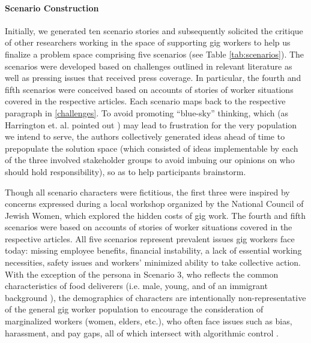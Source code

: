\paragraph{Scenario Construction}
Initially, we generated ten scenario stories and subsequently solicited the critique of other researchers working in the space of supporting gig workers to help us finalize a problem space comprising five scenarios (see Table \ref{tab:scenarios}).
The scenarios were developed based on challenges outlined in relevant literature as well as pressing issues that received press coverage. In particular, the fourth \cite{Al_Jazeera2022-vz} and fifth \cite{noauthor_undated-xr} scenarios were conceived based on accounts of stories of worker situations covered in the respective articles. Each scenario maps back to the respective paragraph in 
\ref{challenges}.
To avoid promoting ``blue-sky'' thinking, which (as Harrington et. al. pointed out \cite{harrington2019deconstructing}) may lead to frustration for the very population we intend to serve, the authors collectively generated ideas ahead of time to prepopulate the solution space (which consisted of ideas implementable by each of the three involved stakeholder groups to avoid imbuing our opinions on who should hold responsibility), so as to help participants brainstorm.

Though all scenario characters were fictitious, the first three were inspired by concerns expressed during a local workshop organized by the National Council of Jewish Women, which explored the hidden costs of gig work. The fourth \cite{Al_Jazeera2022-vz} and fifth \cite{noauthor_undated-xr} scenarios were based on accounts of stories of worker situations covered in the respective articles. All five scenarios represent prevalent issues gig workers face today: missing employee benefits, financial instability, a lack of essential working necessities, safety issues and workers' minimized ability to take collective action. With the exception of the persona in Scenario 3, who reflects the common characteristics of food deliverers (i.e. male, young, and of an immigrant background \cite{ma2022brush}), the demographics of characters are intentionally non-representative of the general gig worker population to encourage the consideration of marginalized workers (women, elders, etc.), who often face issues such as bias, harassment, and pay gaps, all of which intersect with algorithmic control \cite{ma2022brush, anjali2021watched, foong2021understanding, foong2018women, jahanbakhsh2020experimental}.

